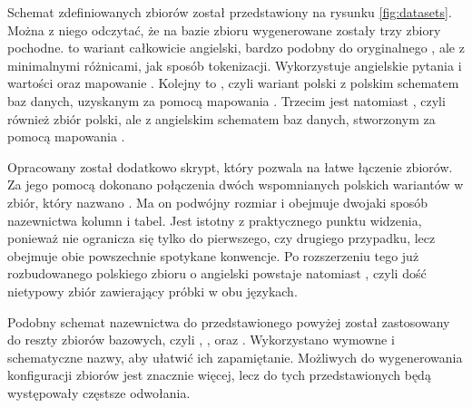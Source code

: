 Schemat zdefiniowanych zbiorów został przedstawiony na rysunku \ref{fig:datasets}. Można z niego odczytać, że na bazie zbioru  wygenerowane zostały trzy zbiory pochodne.  to wariant całkowicie angielski, bardzo podobny do oryginalnego , ale z minimalnymi różnicami, jak sposób tokenizacji. Wykorzystuje angielskie pytania i wartości oraz mapowanie . Kolejny to , czyli wariant polski z polskim schematem baz danych, uzyskanym za pomocą mapowania . Trzecim jest natomiast , czyli również zbiór polski, ale z angielskim schematem baz danych, stworzonym za pomocą mapowania .

Opracowany został dodatkowo skrypt, który pozwala na łatwe łączenie zbiorów. Za jego pomocą dokonano połączenia dwóch wspomnianych polskich wariantów w zbiór, który nazwano . Ma on podwójny rozmiar i obejmuje dwojaki sposób nazewnictwa kolumn i tabel. Jest istotny z praktycznego punktu widzenia, ponieważ nie ogranicza się tylko do pierwszego, czy drugiego przypadku, lecz obejmuje obie powszechnie spotykane konwencje. Po rozszerzeniu tego już rozbudowanego polskiego zbioru o angielski  powstaje natomiast , czyli dość nietypowy zbiór zawierający próbki w obu językach.

Podobny schemat nazewnictwa do przedstawionego powyżej został zastosowany do reszty zbiorów bazowych, czyli , ,  oraz . Wykorzystano wymowne i schematyczne nazwy, aby ułatwić ich zapamiętanie. Możliwych do wygenerowania konfiguracji zbiorów jest znacznie więcej, lecz do tych przedstawionych będą występowały częstsze odwołania.

